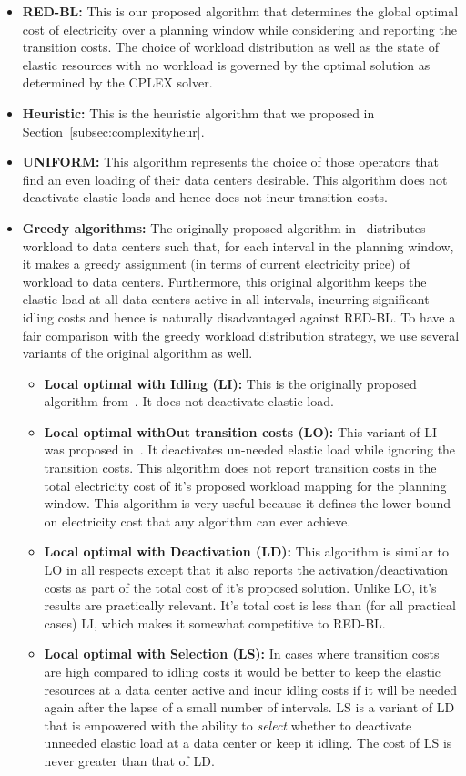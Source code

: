 \begin{itemize}
\item \textbf{RED-BL:} This is our proposed algorithm that determines the global optimal cost of electricity over a planning window while considering and reporting the transition costs. The choice of workload distribution as well as the state of elastic resources with no workload is governed by the optimal solution as determined by the CPLEX solver.
\item \textbf{Heuristic:} This is the heuristic algorithm that we proposed in Section~\ref{subsec:complexityheur}.
\item \textbf{UNIFORM:} This algorithm represents the choice of those operators that find an even loading of their data centers desirable. This algorithm does not deactivate elastic loads and hence does not incur transition costs.
\item \textbf{Greedy algorithms:} The originally proposed algorithm in~\cite{qureshi2009cutting} distributes workload to data centers such that, for each interval in the planning window, it makes a greedy assignment (in terms of current electricity price) of workload to data centers. Furthermore, this original algorithm keeps the elastic load at all data centers active in all intervals, incurring significant idling costs and hence is naturally disadvantaged against RED-BL. To have a fair comparison with the greedy workload distribution strategy, we use several variants of the original algorithm as well.
\begin{itemize}
\item \textbf{Local optimal with Idling (LI):} This is the originally proposed algorithm from~\cite{qureshi2009cutting}. It does not deactivate elastic load.
\item \textbf{Local optimal withOut transition costs (LO):} This variant of LI was proposed in~\cite{qureshi2009cutting}. It deactivates un-needed elastic load while ignoring the transition costs. This algorithm does not report transition costs in the total electricity cost of it's proposed workload mapping for the planning window. This algorithm is very useful because it defines the lower bound on electricity cost that any algorithm can ever achieve.
\item \textbf{Local optimal with Deactivation (LD):} This algorithm is similar to LO in all respects except that it also reports the activation/deactivation costs as part of the total cost of it's proposed solution. Unlike LO, it's results are practically relevant. It's total cost is less than (for all practical cases) LI, which makes it somewhat competitive to RED-BL.
\item \textbf{Local optimal with Selection (LS):} In cases where transition costs are high compared to idling costs it would be better to keep the elastic resources at a data center active and incur idling costs if it will be needed again after the lapse of a small number of intervals. LS is a variant of LD that is empowered with the ability to \textit{select} whether to deactivate unneeded elastic load at a data center or keep it idling. The cost of LS is never greater than that of LD.
\end{itemize}
\end{itemize}

